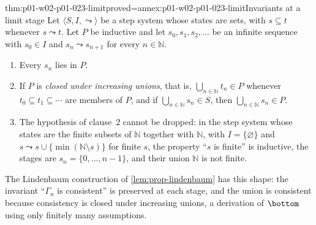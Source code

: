 \begin{hbtheorem}{thm:p01-w02-p01-023-limit}{proved=annex:p01-w02-p01-023-limit}{Invariants at a limit stage}
Let \(\langle S,I,\leadsto\rangle\) be a step system whose states are sets,
with \(s\subseteq t\) whenever \(s\leadsto t\). Let \(P\) be inductive and
let \(s_0,s_1,s_2,\ldots\) be an infinite sequence with \(s_0\in I\) and
\(s_n\leadsto s_{n+1}\) for every \(n\in\mathbb N\).
\begin{enumerate}
  \item Every \(s_n\) lies in \(P\).
  \item If \(P\) is \emph{closed under increasing unions}, that is,
        \(\bigcup_{n\in\mathbb N}t_n\in P\) whenever
        \(t_0\subseteq t_1\subseteq\cdots\) are members of \(P\), and if
        \(\bigcup_{n\in\mathbb N}s_n\in S\), then
        \(\bigcup_{n\in\mathbb N}s_n\in P\).
  \item The hypothesis of clause~2 cannot be dropped: in the step system
        whose states are the finite subsets of \(\mathbb N\) together with
        \(\mathbb N\), with \(I=\{\varnothing\}\) and
        \(s\leadsto s\cup\{\min(\mathbb N\setminus s)\}\) for finite \(s\),
        the property ``\(s\) is finite'' is inductive, the stages are
        \(s_n=\{0,\ldots,n-1\}\), and their union \(\mathbb N\) is not
        finite.
\end{enumerate}
\end{hbtheorem}

The Lindenbaum construction of \cref{lem:prop-lindenbaum} has this shape: the
invariant ``\(\Gamma_n\) is consistent'' is preserved at each stage, and the
union is consistent because consistency is closed under increasing unions,
a derivation of \(\bottom\) using only finitely many assumptions.

